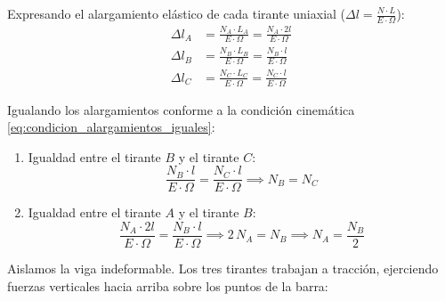 
Expresando el alargamiento elástico de cada tirante uniaxial ($\Delta l = \frac{N \cdot L}{E \cdot \Omega}$):
\begin{align}
    \Delta l_A & = \frac{N_A \cdot L_A}{E \cdot \Omega} = \frac{N_A \cdot 2l}{E \cdot \Omega} \\[6pt]
    \Delta l_B & = \frac{N_B \cdot L_B}{E \cdot \Omega} = \frac{N_B \cdot l}{E \cdot \Omega}  \\[6pt]
    \Delta l_C & = \frac{N_C \cdot L_C}{E \cdot \Omega} = \frac{N_C \cdot l}{E \cdot \Omega}
\end{align}

Igualando los alargamientos conforme a la condición cinemática \eqref{eq:condicion_alargamientos_iguales}:
\begin{enumerate}
    \item Igualdad entre el tirante $B$ y el tirante $C$:
          \begin{equation}
              \frac{N_B \cdot l}{E \cdot \Omega} = \frac{N_C \cdot l}{E \cdot \Omega} \implies \boxed{N_B = N_C}
              \label{eq:rel_nb_nc}
          \end{equation}
    \item Igualdad entre el tirante $A$ y el tirante $B$:
          \begin{equation}
              \frac{N_A \cdot 2l}{E \cdot \Omega} = \frac{N_B \cdot l}{E \cdot \Omega} \implies 2\,N_A = N_B \implies \boxed{N_A = \frac{N_B}{2}}
              \label{eq:rel_na_nb}
          \end{equation}
\end{enumerate}



Aislamos la viga indeformable. Los tres tirantes trabajan a tracción, ejerciendo fuerzas verticales hacia arriba sobre los puntos de la barra:

